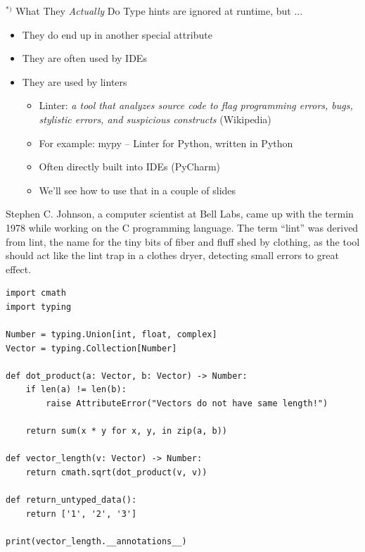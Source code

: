 \begin{frame}[fragile]{$^{*)}$ What They \emph{Actually} Do}
%
Type hints are ignored at runtime, but ...
\begin{itemize}
\item They do end up in another special attribute 
\item They are often used by IDEs
\item They are used by linters
	\begin{itemize}
	\item Linter: \emph{a tool that analyzes source code to flag programming errors, bugs, stylistic errors, and suspicious constructs} (Wikipedia)
	\item For example: mypy -- Linter for Python, written in Python
	\item Often directly built into IDEs (\zB PyCharm)
	\item We'll see how to use that in a couple of slides
	\end{itemize}
\end{itemize}
%
\begin{hintbox}
\footnotesize
Stephen C. Johnson, a computer scientist at Bell Labs, came up with the termin 1978 while working on the C programming language. The term \enquote{lint} was derived from lint, the name for the tiny bits of fiber and fluff shed by clothing, as the tool should act like the lint trap in a clothes dryer, detecting small errors to great effect.
\end{hintbox}
%
\end{frame}


\begin{frame}[fragile]
%
\begin{codebox}
\begin{verbatim}
import cmath
import typing

Number = typing.Union[int, float, complex]
Vector = typing.Collection[Number]

def dot_product(a: Vector, b: Vector) -> Number:
    if len(a) != len(b):
        raise AttributeError("Vectors do not have same length!")

    return sum(x * y for x, y, in zip(a, b))

def vector_length(v: Vector) -> Number:
    return cmath.sqrt(dot_product(v, v))

def return_untyped_data():
    return ['1', '2', '3']

print(vector_length.__annotations__)
\end{verbatim}
\end{codebox}
%
\end{frame}

